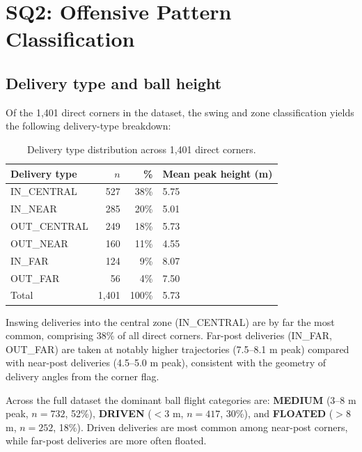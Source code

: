 \section{SQ2: Offensive Pattern Classification}
\label{sec:results_sq2}

\subsection{Delivery type and ball height}

Of the 1{,}401 direct corners in the dataset, the swing and zone
classification yields the following delivery-type breakdown:

\begin{table}[h]
  \centering
  \caption{Delivery type distribution across 1{,}401 direct corners.}
  \label{tab:sq2_delivery_dist}
  \begin{tabular}{lrrl}
    \toprule
    \textbf{Delivery type} & \textbf{$n$} & \textbf{\%} &
    \textbf{Mean peak height (m)} \\
    \midrule
    IN\_CENTRAL  & 527 & 38\% & 5.75 \\
    IN\_NEAR     & 285 & 20\% & 5.01 \\
    OUT\_CENTRAL & 249 & 18\% & 5.73 \\
    OUT\_NEAR    & 160 & 11\% & 4.55 \\
    IN\_FAR      & 124 &  9\% & 8.07 \\
    OUT\_FAR     &  56 &  4\% & 7.50 \\
    \midrule
    Total        & 1{,}401 & 100\% & 5.73 \\
    \bottomrule
  \end{tabular}
\end{table}

Inswing deliveries into the central zone (IN\_CENTRAL) are by far the
most common, comprising 38\% of all direct corners. Far-post deliveries
(IN\_FAR, OUT\_FAR) are taken at notably higher trajectories (7.5--8.1 m
peak) compared with near-post deliveries (4.5--5.0 m peak), consistent
with the geometry of delivery angles from the corner flag.

Across the full dataset the dominant ball flight categories are:
\textbf{MEDIUM} (3--8 m peak, $n = 732$, 52\%),
\textbf{DRIVEN} ($<$3 m, $n = 417$, 30\%),
and \textbf{FLOATED} ($>$8 m, $n = 252$, 18\%).
Driven deliveries are most common among near-post corners, while far-post
deliveries are more often floated.


